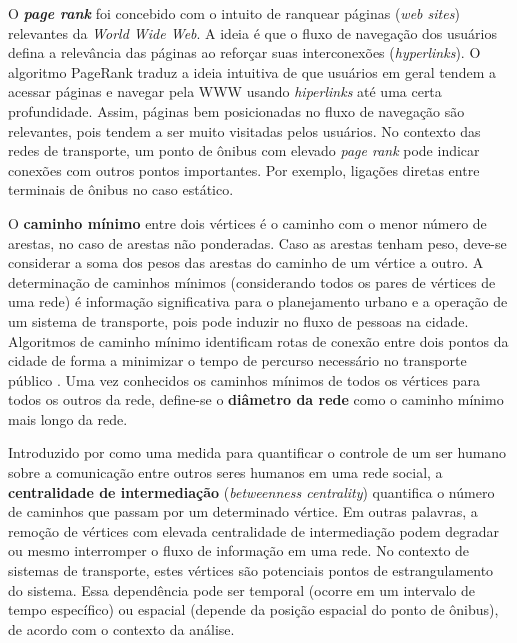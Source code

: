 O {\bf \emph{page rank}} foi concebido com o intuito de ranquear páginas (\emph{web sites}) relevantes da \emph{World Wide Web}. A ideia é que o fluxo de navegação dos usuários defina a relevância das páginas ao reforçar suas interconexões (\emph{hyperlinks}). O algoritmo PageRank \cite{brin:98} traduz a ideia intuitiva de que usuários em geral tendem a acessar páginas e navegar pela WWW usando \emph{hiperlinks} até uma certa profundidade. Assim, páginas bem posicionadas no fluxo de navegação são relevantes, pois tendem a ser muito visitadas pelos usuários. No contexto das redes de transporte, um ponto de ônibus com elevado \emph{page rank} pode indicar conexões com outros pontos importantes. Por exemplo, ligações diretas entre terminais de ônibus no caso estático.

O {\bf caminho mínimo} entre dois vértices é o caminho com o menor número de arestas, no caso de arestas não ponderadas. Caso as arestas tenham peso, deve-se considerar a soma dos pesos das arestas do caminho de um vértice a outro. A determinação de caminhos mínimos (considerando todos os pares de vértices de uma rede) é informação significativa para o planejamento urbano e a operação de um sistema de transporte, pois pode induzir no fluxo de pessoas na cidade. Algoritmos de caminho mínimo identificam rotas de conexão entre dois pontos da cidade de forma a minimizar o tempo de percurso necessário no transporte público \cite{Mart:2009, Larson:81}. Uma vez conhecidos os caminhos mínimos de todos os vértices para todos os outros da rede, define-se o {\bf diâmetro da rede} como o caminho mínimo mais longo da rede.

Introduzido por \cite{free:77} como uma medida para quantificar o controle de um ser humano sobre a comunicação entre outros seres humanos em uma rede social, a {\bf centralidade de intermediação} (\emph{betweenness centrality}) quantifica o número de caminhos que passam por um determinado vértice. Em outras palavras, a remoção de vértices com elevada centralidade de intermediação podem degradar ou mesmo interromper o fluxo de informação em uma rede. No contexto de sistemas de transporte, estes vértices são potenciais pontos de estrangulamento do sistema. Essa dependência pode ser temporal (ocorre em um intervalo de tempo específico) ou espacial (depende da posição espacial do ponto de ônibus), de acordo com o contexto da análise.






